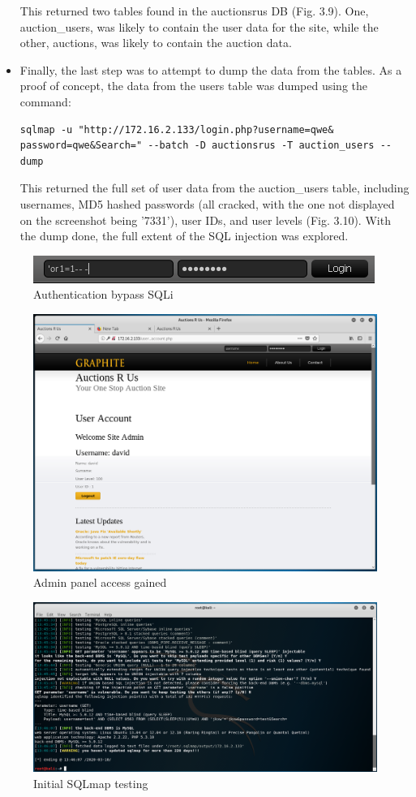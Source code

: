 \documentclass{report}
\begin{document}
\begin{itemize}
	This returned two tables found in the auctionsrus DB (Fig. 3.9). One, auction\_users, was likely to contain the user data for the site, while the other, auctions, was likely to contain the auction data.
	\item Finally, the last step was to attempt to dump the data from the tables. As a proof of concept, the data from the users table was dumped using the command:
\begin{verbatim}
sqlmap -u "http://172.16.2.133/login.php?username=qwe&
password=qwe&Search=" --batch -D auctionsrus -T auction_users --dump
\end{verbatim}
	This returned the full set of user data from the auction\_users table, including usernames, MD5 hashed passwords (all cracked, with the one not displayed on the screenshot being '7331'), user IDs, and user levels (Fig. 3.10). With the dump done, the full extent of the SQL injection was explored.
\end{itemize}
\pagebreak
\begin{figure}[!htb]
	\centering
	\includegraphics[scale=1]{img/sqli1.png}
	\caption{Authentication bypass SQLi}
\end{figure}
\begin{figure}[!htb]
	\centering
	\includegraphics[scale=0.4]{img/sqli2.png}
	\caption{Admin panel access gained}
\end{figure}
\begin{figure}[!htb]
	\centering
	\includegraphics[scale=0.3]{img/sqlmap1.png}
	\caption{Initial SQLmap testing}
\end{figure}	
\end{document}
